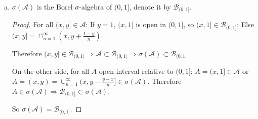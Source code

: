 \documentclass[11pt]{article}
\begin{document}
\begin{enumerate}[1.]
\begin{enumerate}[(a)]
\begin{proof}
\begin{enumerate}[i.]
                And we can continuously do this when $W = \cup_{i=1}^n (x_i,y_i]$ for some not pairwise disjoint $(x_i, y_i]$ and $n > 1$, since $n$ is finite. We finally will reduce $n$ to $1$ or reduce $\{(x_i,y_i]\}$ to a pairwise disjoint collection but leave $W$ unchanged. Therefore $W$ is in $\mathcal{C}$.

                So that $A \cup B \in \mathcal{C}$.
            \end{enumerate}
            Therefore $\mathcal{C}$ is an algebra, which ends the proof.
        \end{proof}
        
        \item
        $\sigma(\mathcal{A})$ is the Borel $\sigma$-algebra of $(0,1]$, denote it by $\mathcal{B}_{(0,1]}$.
        \begin{proof}
            For all $(x,y] \in \mathcal{A}$: If $y = 1$, $(x,1]$ is open in $(0,1]$, so $(x,1] \in \mathcal{B}_{(0,1]}$; 
            Else $(x,y] = \cap_{n=1}^\infty (x, y+\frac{1-y}{n})$.
            
            Therefore $(x,y] \in \mathcal{B}_{(0,1]} \Rightarrow \mathcal{A} \subset \mathcal{B}_{(0,1]} \Rightarrow \sigma(\mathcal{A}) \subset \mathcal{B}_{(0,1]}$

            On the other side, for all $A$ open interval relative to $(0,1]$: $A = (x,1] \in \mathcal{A}$ or $A = (x,y) = \cup_{n=1}^\infty (x,y-\frac{y-x}{n}] \in \sigma(\mathcal{A})$.
            Therefore $A \in \sigma(\mathcal{A}) \Rightarrow \mathcal{B}_{(0,1]} \subset \sigma(\mathcal{A})$.
            
            So $\sigma(\mathcal{A}) = \mathcal{B}_{(0,1]}$.
        \end{proof} 
    \end{enumerate}
    

\end{enumerate}
\end{document}

